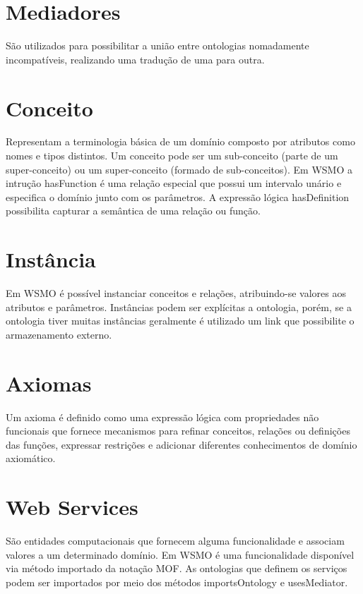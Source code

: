 \documentclass{article}
\begin{document}
\section{Mediadores}
São utilizados para possibilitar a união entre ontologias nomadamente incompatíveis, realizando uma tradução de uma para outra.
\section{Conceito}
Representam a terminologia básica de um domínio composto por atributos como nomes e tipos distintos. Um conceito pode ser um sub-conceito (parte de um super-conceito) ou um super-conceito (formado de sub-conceitos). Em WSMO a intrução hasFunction é uma relação especial que possui um intervalo unário e especifica o domínio junto com os parâmetros. A expressão lógica hasDefinition possibilita capturar a semântica de uma relação ou função.
\section{Instância}
Em WSMO é possível instanciar conceitos e relações, atribuindo-se valores aos atributos e parâmetros. Instâncias podem ser explícitas a ontologia, porém, se a ontologia tiver muitas instâncias geralmente é utilizado um link que possibilite o armazenamento externo.
\section{Axiomas}
Um axioma é definido como uma expressão lógica com propriedades não funcionais que fornece mecanismos para refinar conceitos, relações ou definições das funções, expressar restrições e adicionar diferentes conhecimentos de domínio axiomático.
\section{Web Services}
São entidades computacionais que fornecem alguma funcionalidade e associam valores a um determinado domínio. Em WSMO é uma funcionalidade disponível via método importado da notação MOF. As ontologias que definem os serviços podem ser importados por meio dos métodos importsOntology e usesMediator.
\section{}
\end{document}
